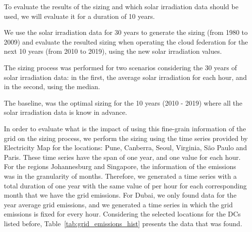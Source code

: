 To evaluate the results of the sizing and which solar irradiation data should be used, we will evaluate it for a duration of 10 years. 

We use the solar irradiation data for 30 years to generate the sizing (from 1980 to 2009) and evaluate the resulted sizing when operating the cloud federation for the next 10 years (from 2010 to 2019), using the new solar irradiation values.

The sizing process was performed for two scenarios considering the 30 years of solar irradiation data: in the first, the average solar irradiation for each hour, and in the second, using the median.

The baseline, was the optimal sizing for the 10 years (2010 - 2019) where all the solar irradiation data is know in advance.




In order to evaluate what is the impact of using this fine-grain information of the grid  on the sizing process, we perform the sizing using the time series provided by Electricity Map for the locations: Pune, Canberra, Seoul, Virginia, São Paulo and Paris. These time series have the span of one year, and one value for each hour. For the regions Johannesburg and Singapore, the information of the  emissions was in the granularity of months. Therefore, we generated a time series with a total duration of one year with the same value of  per hour for each corresponding month that we have the grid  emissions. For Dubai, we only found data for the year average grid  emissions, and we generated a time series in which the grid emissions is fixed for every hour. Considering the selected locations for the DCs listed before, Table~\ref{tab:grid_emissions_hist} presents the data that was found.

